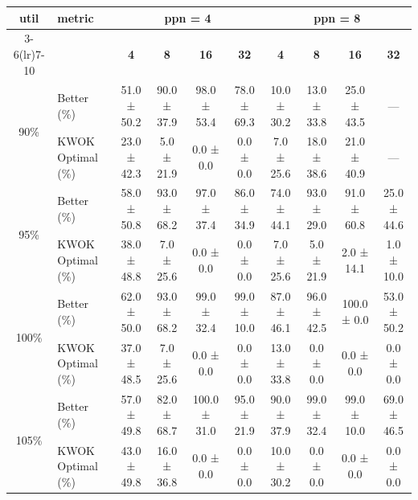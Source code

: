 \begin{tabular}{@{}c l *{8}{c}@{}}
\toprule
\multirow{2}{*}{\textbf{util}} & \multirow{2}{*}{\textbf{metric}} &\multicolumn{4}{c}{\textbf{ppn = 4}} & \multicolumn{4}{c}{\textbf{ppn = 8}}\\
\cmidrule(lr){3-6}\cmidrule(lr){7-10}
 &  & \textbf{4} & \textbf{8} & \textbf{16} & \textbf{32} & \textbf{4} & \textbf{8} & \textbf{16} & \textbf{32}\\
\midrule
\multirow{2}{*}{90\%}
& Better\,(\%) & 51.0 ± 50.2 & 90.0 ± 37.9 & 98.0 ± 53.4 & 78.0 ± 69.3 & 10.0 ± 30.2 & 13.0 ± 33.8 & 25.0 ± 43.5 & \multicolumn{1}{c}{—} \\
& KWOK\,Optimal\,(\%) & 23.0 ± 42.3 & 5.0 ± 21.9 & 0.0 ± 0.0 & 0.0 ± 0.0 & 7.0 ± 25.6 & 18.0 ± 38.6 & 21.0 ± 40.9 & \multicolumn{1}{c}{—} \\
\midrule
\multirow{2}{*}{95\%}
& Better\,(\%) & 58.0 ± 50.8 & 93.0 ± 68.2 & 97.0 ± 37.4 & 86.0 ± 34.9 & 74.0 ± 44.1 & 93.0 ± 29.0 & 91.0 ± 60.8 & 25.0 ± 44.6 \\
& KWOK\,Optimal\,(\%) & 38.0 ± 48.8 & 7.0 ± 25.6 & 0.0 ± 0.0 & 0.0 ± 0.0 & 7.0 ± 25.6 & 5.0 ± 21.9 & 2.0 ± 14.1 & 1.0 ± 10.0 \\
\midrule
\multirow{2}{*}{100\%}
& Better\,(\%) & 62.0 ± 50.0 & 93.0 ± 68.2 & 99.0 ± 32.4 & 99.0 ± 10.0 & 87.0 ± 46.1 & 96.0 ± 42.5 & 100.0 ± 0.0 & 53.0 ± 50.2 \\
& KWOK\,Optimal\,(\%) & 37.0 ± 48.5 & 7.0 ± 25.6 & 0.0 ± 0.0 & 0.0 ± 0.0 & 13.0 ± 33.8 & 0.0 ± 0.0 & 0.0 ± 0.0 & 0.0 ± 0.0 \\
\midrule
\multirow{2}{*}{105\%}
& Better\,(\%) & 57.0 ± 49.8 & 82.0 ± 68.7 & 100.0 ± 31.0 & 95.0 ± 21.9 & 90.0 ± 37.9 & 99.0 ± 32.4 & 99.0 ± 10.0 & 69.0 ± 46.5 \\
& KWOK\,Optimal\,(\%) & 43.0 ± 49.8 & 16.0 ± 36.8 & 0.0 ± 0.0 & 0.0 ± 0.0 & 10.0 ± 30.2 & 0.0 ± 0.0 & 0.0 ± 0.0 & 0.0 ± 0.0 \\
\bottomrule
\end{tabular}
